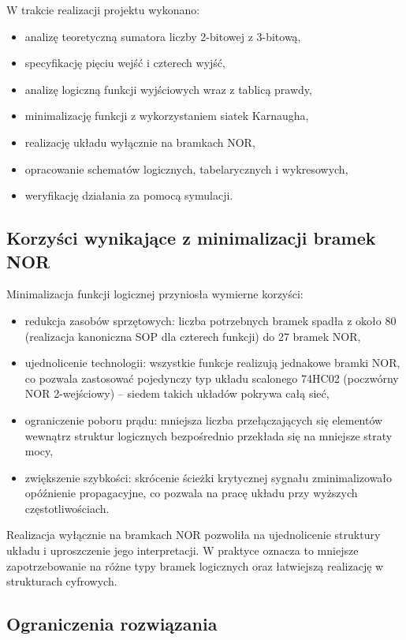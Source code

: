 \documentclass[11pt]{article}
\begin{document}
W trakcie realizacji projektu wykonano:
\begin{itemize}
    \item analizę teoretyczną sumatora liczby 2-bitowej z 3-bitową,
    \item specyfikację pięciu wejść i czterech wyjść,
    \item analizę logiczną funkcji wyjściowych wraz z tablicą prawdy,
    \item minimalizację funkcji z wykorzystaniem siatek Karnaugha,
    \item realizację układu wyłącznie na bramkach NOR,
    \item opracowanie schematów logicznych, tabelarycznych i wykresowych,
    \item weryfikację działania za pomocą symulacji.
\end{itemize}

\subsection{Korzyści wynikające z minimalizacji bramek NOR}

Minimalizacja funkcji logicznej przyniosła wymierne korzyści:
\begin{itemize}
    \item redukcja zasobów sprzętowych: liczba potrzebnych bramek spadła z około 80 (realizacja kanoniczna SOP dla czterech funkcji) do 27 bramek NOR,
    \item ujednolicenie technologii: wszystkie funkcje realizują jednakowe bramki NOR, co pozwala zastosować pojedynczy typ układu scalonego 74HC02 (poczwórny NOR 2-wejściowy) -- siedem takich układów pokrywa całą sieć,
    \item ograniczenie poboru prądu: mniejsza liczba przełączających się elementów wewnątrz struktur logicznych bezpośrednio przekłada się na mniejsze straty mocy,
    \item zwiększenie szybkości: skrócenie ścieżki krytycznej sygnału zminimalizowało opóźnienie propagacyjne, co pozwala na pracę układu przy wyższych częstotliwościach.
\end{itemize}

Realizacja wyłącznie na bramkach NOR pozwoliła na ujednolicenie struktury układu i uproszczenie jego interpretacji. W praktyce oznacza to mniejsze zapotrzebowanie na różne typy bramek logicznych oraz łatwiejszą realizację w strukturach cyfrowych.

\subsection{Ograniczenia rozwiązania}
\end{document}
